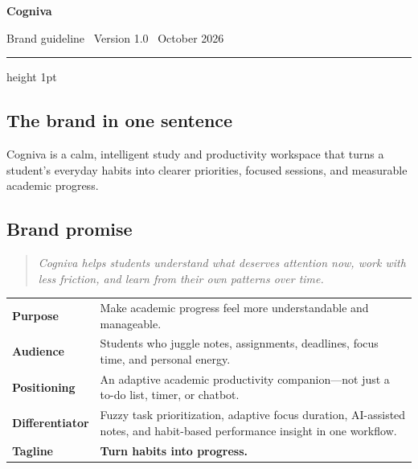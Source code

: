 \documentclass[11pt,a4paper]{article}
\newcommand{\sectiontitle}[1]{\vspace{4pt}{\color{CognivaForest}\LARGE\bfseries #1}\par\vspace{5pt}\hrule height 1pt\vspace{10pt}}
\begin{document}
\begin{titlepage}
\pagecolor{CognivaIvory}\color{CognivaInk}
\vspace*{1.2cm}
{\fontsize{54}{58}\selectfont\bfseries\color{CognivaForest} Cogniva\par}
\vfill
\begin{center}
\end{center}
\vfill
{\large Brand guideline \textbar\ Version 1.0 \textbar\ October 2026\par}
\end{titlepage}
\nopagecolor

\sectiontitle{01 — Brand foundation}
\subsection*{The brand in one sentence}
Cogniva is a calm, intelligent study and productivity workspace that turns a student's everyday habits into clearer priorities, focused sessions, and measurable academic progress.

\subsection*{Brand promise}
\begin{quote}\large\itshape Cogniva helps students understand what deserves attention now, work with less friction, and learn from their own patterns over time.\end{quote}

\begin{tabularx}{\textwidth}{>{\bfseries}p{3.2cm}X}
Purpose & Make academic progress feel more understandable and manageable.\\
Audience & Students who juggle notes, assignments, deadlines, focus time, and personal energy.\\
Positioning & An adaptive academic productivity companion—not just a to-do list, timer, or chatbot.\\
Differentiator & Fuzzy task prioritization, adaptive focus duration, AI-assisted notes, and habit-based performance insight in one workflow.\\
Tagline & \textbf{Turn habits into progress.}
\end{tabularx}
\end{document}
